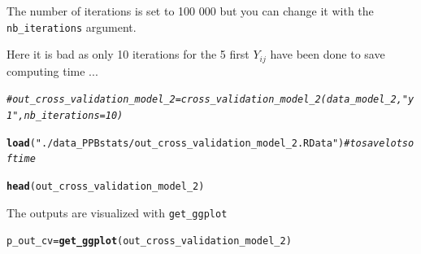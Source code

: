 \documentclass{book}\usepackage[]{graphicx}\usepackage[]{color}
\makeatletter
\newcommand{\hlstr}[1]{\textcolor[rgb]{0.192,0.494,0.8}{#1}}%
\newcommand{\hlcom}[1]{\textcolor[rgb]{0.678,0.584,0.686}{\textit{#1}}}%
\newcommand{\hlstd}[1]{\textcolor[rgb]{0.345,0.345,0.345}{#1}}%
\newcommand{\hlkwb}[1]{\textcolor[rgb]{0.69,0.353,0.396}{#1}}%
\newcommand{\hlkwd}[1]{\textcolor[rgb]{0.737,0.353,0.396}{\textbf{#1}}}%
\newenvironment{kframe}{%
 \def\at@end@of@kframe{}%
 \ifinner\ifhmode%
  \def\at@end@of@kframe{\end{minipage}}%
  \begin{minipage}{\columnwidth}%
 \fi\fi%
 \def\FrameCommand##1{\hskip\@totalleftmargin \hskip-\fboxsep
 \colorbox{shadecolor}{##1}\hskip-\fboxsep
     \hskip-\linewidth \hskip-\@totalleftmargin \hskip\columnwidth}%
 \MakeFramed {\advance\hsize-\width
   \@totalleftmargin\z@ \linewidth\hsize
   \@setminipage}}%
 {\par\unskip\endMakeFramed%
 \at@end@of@kframe}
\newenvironment{knitrout}{}{} %
\makeatother
\begin{document}
The number of iterations is set to 100 000 but you can change it with the \texttt{nb\_iterations} argument.

Here it is bad as only 10 iterations for the 5 first $Y_{ij}$ have been done to save computing time ...

\begin{knitrout}
\color{fgcolor}\begin{kframe}
\begin{alltt}
\hlcom{# out_cross_validation_model_2 = cross_validation_model_2(data_model_2, "y1", nb_iterations = 10)}

\hlkwd{load}\hlstd{(}\hlstr{"./data_PPBstats/out_cross_validation_model_2.RData"}\hlstd{)} \hlcom{# to save lots of time}
\end{alltt}


{\ttfamily\noindent\color{warningcolor}{\#\# Warning in readChar(con, 5L, useBytes = TRUE): impossible d'ouvrir le fichier compressé './data\_PPBstats/out\_cross\_validation\_model\_2.RData', cause probable : 'Aucun fichier ou dossier de ce type'}}

{\ttfamily\noindent\bfseries\color{errorcolor}{\#\# Error in readChar(con, 5L, useBytes = TRUE): impossible d'ouvrir la connexion}}\begin{alltt}
\hlkwd{head}\hlstd{(out_cross_validation_model_2)}
\end{alltt}


{\ttfamily\noindent\bfseries\color{errorcolor}{\#\# Error in head(out\_cross\_validation\_model\_2): objet 'out\_cross\_validation\_model\_2' introuvable}}\end{kframe}
\end{knitrout}

The outputs are visualized with \texttt{get\_ggplot}

\begin{knitrout}
\color{fgcolor}\begin{kframe}
\begin{alltt}
\hlstd{p_out_cv} \hlkwb{=} \hlkwd{get_ggplot}\hlstd{(out_cross_validation_model_2)}
\end{alltt}


{\ttfamily\noindent\bfseries\color{errorcolor}{\#\# Error in get\_ggplot(out\_cross\_validation\_model\_2): objet 'out\_cross\_validation\_model\_2' introuvable}}\end{kframe}
\end{knitrout}
\end{document}
